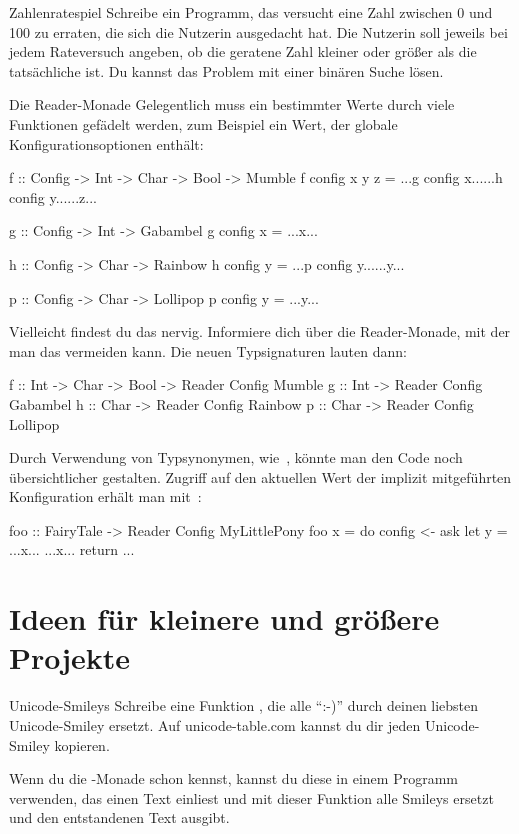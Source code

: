 \documentclass{uebblatt}
\begin{document}
\begin{aufgabe}{Zahlenratespiel}
Schreibe ein Programm, das versucht eine Zahl zwischen 0 und 100 zu erraten, die sich die Nutzerin ausgedacht hat. Die Nutzerin soll jeweils bei jedem Rateversuch angeben, ob die geratene Zahl kleiner oder größer als die tatsächliche ist. Du kannst das Problem mit einer binären Suche lösen.
\end{aufgabe}

\begin{aufgabe}{Die Reader-Monade}
Gelegentlich muss ein bestimmter Werte durch viele Funktionen gefädelt werden,
zum Beispiel ein Wert, der globale Konfigurationsoptionen enthält:
\begin{haskellcode}
f :: Config -> Int -> Char -> Bool -> Mumble
f config x y z = ...g config x......h config y......z...

g :: Config -> Int -> Gabambel
g config x     = ...x...

h :: Config -> Char -> Rainbow
h config y     = ...p config y......y...

p :: Config -> Char -> Lollipop
p config y     = ...y...
\end{haskellcode}
Vielleicht findest du das nervig. Informiere dich über die Reader-Monade, mit
der man das vermeiden kann. Die neuen Typsignaturen lauten dann:
\begin{haskellcode}
f :: Int -> Char -> Bool -> Reader Config Mumble
g :: Int -> Reader Config Gabambel
h :: Char -> Reader Config Rainbow
p :: Char -> Reader Config Lollipop
\end{haskellcode}
Durch Verwendung von Typsynonymen, wie~,
könnte man den Code noch übersichtlicher gestalten. Zugriff auf den aktuellen
Wert der implizit mitgeführten Konfiguration erhält man mit~:
\begin{haskellcode}
foo :: FairyTale -> Reader Config MyLittlePony
foo x = do
    config <- ask
    let y = ...x...
    ...x...
    return ...
\end{haskellcode}
\end{aufgabe}


\section{Ideen für kleinere und größere Projekte}

\begin{aufgabe}{Unicode-Smileys}
	Schreibe eine Funktion , die alle "`:-)"' durch deinen liebsten Unicode-Smiley ersetzt. Auf unicode-table.com kannst du dir jeden Unicode-Smiley kopieren.

	Wenn du die -Monade schon kennst, kannst du diese in einem Programm verwenden, das einen Text einliest und mit dieser Funktion alle Smileys ersetzt und den entstandenen Text ausgibt.
\end{aufgabe}
\end{document}
